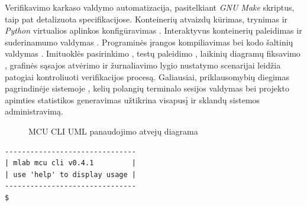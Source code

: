 Verifikavimo karkaso valdymo automatizacija, pasitelkiant \textit{GNU Make} skriptus, taip pat detalizuota specifikacijose. Konteinerių atvaizdų kūrimas, trynimas \lent{\ref{tab:usecase:script:make:image}} ir \textit{Python} virtualios aplinkos konfigūravimas \lent{\ref{tab:usecase:script:setup:python:venv}}. Interaktyvus konteinerių paleidimas \lent{\ref{tab:usecase:script:run}} ir suderinamumo  valdymas \lent{\ref{tab:usecase:script:patch}}. Programinės įrangos kompiliavimas \lent{\ref{tab:usecase:script:buildsoftware}} bei kodo šaltinių valdymas \lent{\ref{tab:usecase:script:manage:sources}}. Imituoklės pasirinkimo \lent{\ref{tab:usecase:sim:choosesimulator}}, testų paleidimo \lent{\ref{tab:usecase:sim:runtests}}, laikinių diagramų fiksavimo \lent{\ref{tab:usecase:sim:capturewaveforms}}, grafinės sąsajos atvėrimo \lent{\ref{tab:usecase:sim:opengui}} ir žurnaliavimo lygio nustatymo \lent{\ref{tab:usecase:sim:managelogging}} scenarijai leidžia patogiai kontroliuoti verifikacijos procesą. Galiausiai, priklausomybių diegimas pagrindinėje sistemoje \lent{\ref{tab:usecase:script:installdeps}}, kelių polangių terminalo sesijos valdymas \lent{\ref{tab:usecase:script:managemultipane}} bei projekto apimties statistikos generavimas \lent{\ref{tab:usecase:script:projectstats}} užtikrina visapusį ir sklandų sistemos administravimą.

\begin{figure}[H]
	
	\caption{MCU CLI UML panaudojimo atvejų diagrama}
	\label{fig:uml_use_case_cli}
\end{figure}

\newsavebox{\cligreetcodebox}
\begin{lrbox}{\cligreetcodebox}
	\begin{minipage}{7.3cm}
		\begin{lstlisting}[basicstyle=\ttfamily\footnotesize]
-------------------------------
| mlab mcu cli v0.4.1         |
| use 'help' to display usage |
-------------------------------
$
		\end{lstlisting}
	\end{minipage}
\end{lrbox}


